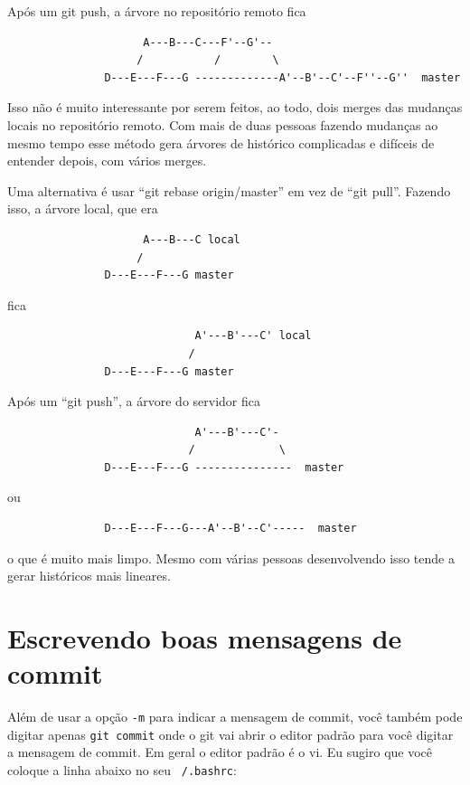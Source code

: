 \documentclass[12pt,brazil]{book}
\begin{document}
Após um git push, a árvore no repositório remoto fica

\begin{verbatim}
                     A---B---C---F'--G'-- 
                    /           /        \
               D---E---F---G -------------A'--B'--C'--F''--G''  master
\end{verbatim}

Isso não é muito interessante por serem feitos, ao todo, dois merges
das mudanças locais no repositório remoto. Com mais de duas pessoas
fazendo mudanças ao mesmo tempo esse método gera árvores de histórico
complicadas e difíceis de entender depois, com vários merges.

Uma alternativa é usar ``git rebase origin/master'' em vez de ``git
pull''. Fazendo isso, a árvore local, que era

\begin{verbatim}
                     A---B---C local
                    /
               D---E---F---G master
\end{verbatim}

fica

\begin{verbatim}
                             A'---B'---C' local
                            /
               D---E---F---G master
\end{verbatim}

Após um ``git push'', a árvore do servidor fica

\begin{verbatim}
                             A'---B'---C'-
                            /             \
               D---E---F---G ---------------  master
\end{verbatim}

ou

\begin{verbatim}
               D---E---F---G---A'--B'--C'-----  master
\end{verbatim}

o que é muito mais limpo. Mesmo com várias pessoas desenvolvendo isso
tende a gerar históricos mais lineares.

\section{Escrevendo boas mensagens de commit}
\label{sec:escr-boas-mens}

Além de usar a opção \texttt{-m} para indicar a mensagem de commit,
você também pode digitar apenas \texttt{git commit} onde o git vai
abrir o editor padrão para você digitar a mensagem de commit. Em geral
o editor padrão é o vi. Eu sugiro que você coloque a linha abaixo no
seu \texttt{~/.bashrc}:
\end{document}
